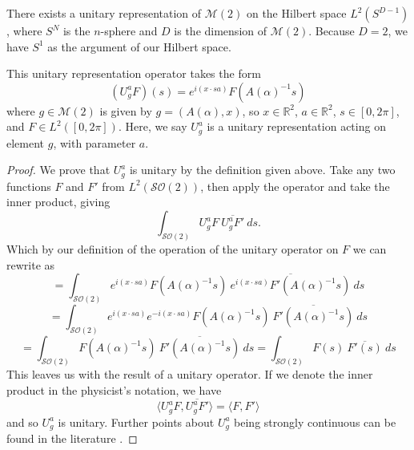 \documentclass{article}
\begin{document}
\begin{theorem}
    There exists a unitary representation of $\mathcal{M}(2)$ on the Hilbert space ${L}^{2}(S^{D-1})$, where $S^{N}$ is the $n$-sphere and $D$ is the dimension of $\mathcal{M}(2)$. Because $D=2$, we have $S^{1}$ as the argument of our Hilbert space.

    This unitary representation operator takes the form
    \[%
        (U^{a}_{g}F)(s) = e^{i(x \cdot sa)}F(A(\alpha)^{-1}s)
    \]%
    where $g \in \mathcal{M}(2)$ is given by $g = (A(\alpha), x)$, so $x \in \mathbb{R}^{2}$, $a \in \mathbb{R}^{2}$, $s \in [0,2\pi]$,  and $F \in L^{2}([0,2\pi])$. Here, we say $U^{a}_{g}$ is a unitary representation acting on element $g$, with parameter $a$. 
\end{theorem}
\begin{proof}
    We prove that $U^{a}_{g}$ is unitary by the definition given above.
    Take any two functions $F$ and $F'$ from $L^{2}(\mathcal{SO}(2))$, then apply the operator and take the inner product, giving
    \[%
        \int_{\mathcal{SO}(2)} U^{a}_{g}F\ \overline{U^{a}_{g}F'} \ ds
    .\]%
    Which by our definition of the operation of the unitary operator on $F$ we can rewrite as 
    \[%
        =
        \int_{\mathcal{SO}(2)} 
        e^{i(x \cdot sa)}F(A(\alpha)^{-1}s) \
        \overline{e^{i(x \cdot sa)}F'(A(\alpha)^{-1}s)}
        \ ds
    \]%
    \[%
        =
        \int_{\mathcal{SO}(2)} 
        e^{i(x \cdot sa)} e^{-i(x \cdot sa)} 
        F(A(\alpha)^{-1}s) \
        \overline{F'(A(\alpha)^{-1}s)}
        \ ds
    \]%
    \[%
        =
        \int_{\mathcal{SO}(2)} 
        F(A(\alpha)^{-1}s) \
        \overline{F'(A(\alpha)^{-1}s)}
        \ ds
        =
        \int_{\mathcal{SO}(2)} 
        F(s) \
        \overline{F'(s)}
        \ ds 
    \]%
    This leaves us with the result of a unitary operator. If we denote the inner product in the physicist's notation, we have
    \[%
        \langle   U^{a}_{g}F ,  \overline{U^{a}_{g}F'}  \rangle
        =
        \langle F ,  F'  \rangle
    \]%
    and so $U^{a}_{g}$ is unitary. Further points about $U^{a}_{g}$ being strongly continuous can be found in the literature \cite{sugiura}.
\end{proof}
\end{document}
